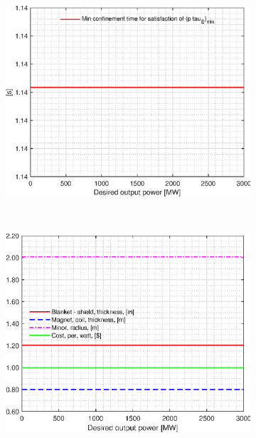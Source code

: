 \begin{figure}[H]
	\centering
	\begin{subfigure}[b]{.45\textwidth}
		\includegraphics[width=\textwidth]{MatlabFigures/PE/f1.eps}
	\end{subfigure}
	~
	\begin{subfigure}[b]{.45\textwidth}
		\includegraphics[width=\textwidth]{MatlabFigures/PE/f2.eps}
	\end{subfigure}


\end{figure}
